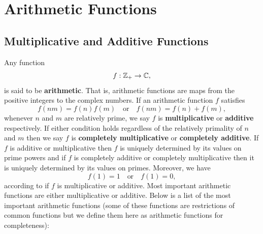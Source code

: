 \chapter{Arithmetic Functions}
  \section{Multiplicative and Additive Functions}
    Any function
    \[
      f:\mathbb{Z}_{+} \to \mathbb{C},
    \]
    is said to be \textbf{arithmetic}. That is, arithmetic functions are maps from the positive integers to the complex numbers. If an arithmetic function \(f\) satisfies
    \[
      f(nm) = f(n)f(m) \quad \text{or} \quad f(nm) = f(n)+f(m),
    \]
    whenever \(n\) and \(m\) are relatively prime, we say \(f\) is \textbf{multiplicative} or \textbf{additive} respectively. If either condition holds regardless of the relatively primality of \(n\) and \(m\) then we say \(f\) is \textbf{completely multiplicative} or \textbf{completely additive}. If \(f\) is additive or multiplicative then \(f\) is uniquely determined by its values on prime powers and if \(f\) is completely additive or completely multiplicative then it is uniquely determined by its values on primes. Moreover, we have
    \[
      f(1) = 1 \quad \text{or} \quad f(1) = 0,
    \]
    according to if \(f\) is multiplicative or additive. Most important arithmetic functions are either multiplicative or additive. Below is a list of the most important arithmetic functions (some of these functions are restrictions of common functions but we define them here as arithmetic functions for completeness):
